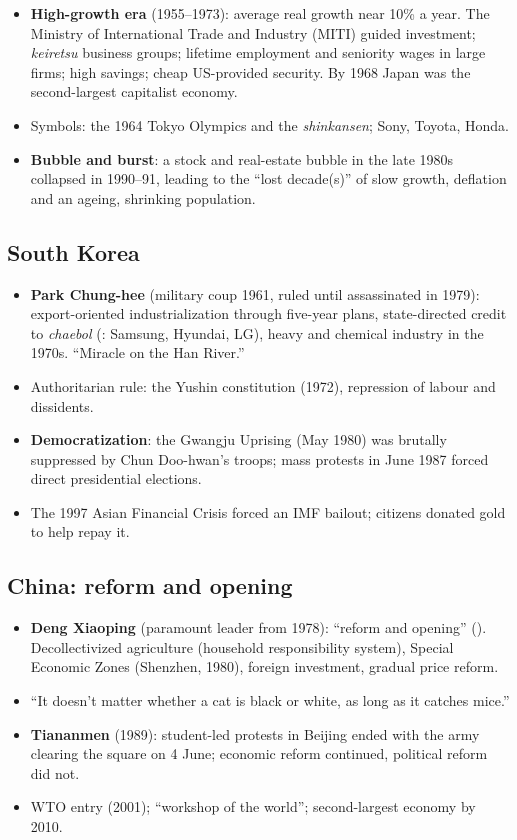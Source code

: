 \begin{itemize}
  \item \textbf{High-growth era} (1955--1973): average real growth near 10\% a year. The
        Ministry of International Trade and Industry (MITI) guided investment;
        \emph{keiretsu} business groups; lifetime employment and seniority wages in large
        firms; high savings; cheap US-provided security. By 1968 Japan was the
        second-largest capitalist economy.
  \item Symbols: the 1964 Tokyo Olympics and the \emph{shinkansen}; Sony, Toyota, Honda.
  \item \textbf{Bubble and burst}: a stock and real-estate bubble in the late 1980s collapsed
        in 1990--91, leading to the ``lost decade(s)'' of slow growth, deflation and an
        ageing, shrinking population.
\end{itemize}

\subsection{South Korea}

\begin{itemize}
  \item \textbf{Park Chung-hee} (military coup 1961, ruled until assassinated in 1979):
        export-oriented industrialization through five-year plans, state-directed credit to
        \emph{chaebol} (: Samsung, Hyundai, LG), heavy and chemical industry in the
        1970s. ``Miracle on the Han River.''
  \item Authoritarian rule: the Yushin constitution (1972), repression of labour and
        dissidents.
  \item \textbf{Democratization}: the Gwangju Uprising (May 1980) was brutally suppressed by
        Chun Doo-hwan's troops; mass protests in June 1987 forced direct presidential
        elections.
  \item The 1997 Asian Financial Crisis forced an IMF bailout; citizens donated gold to help
        repay it.
\end{itemize}

\subsection{China: reform and opening}

\begin{itemize}
  \item \textbf{Deng Xiaoping} (paramount leader from 1978): ``reform and opening''
        (). Decollectivized agriculture (household responsibility system),
        Special Economic Zones (Shenzhen, 1980), foreign investment, gradual price reform.
  \item ``It doesn't matter whether a cat is black or white, as long as it catches mice.''
  \item \textbf{Tiananmen} (1989): student-led protests in Beijing ended with the army
        clearing the square on 4 June; economic reform continued, political reform did not.
  \item WTO entry (2001); ``workshop of the world''; second-largest economy by 2010.
\end{itemize}

